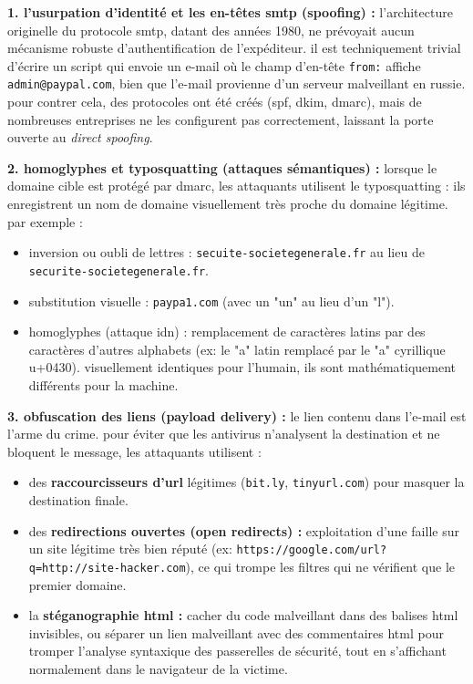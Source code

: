 \documentclass[12pt,a4paper]{report}
\begin{document}
\textbf{1. l'usurpation d'identité et les en-têtes smtp (spoofing) :}
l'architecture originelle du protocole smtp, datant des années 1980, ne prévoyait aucun mécanisme robuste d'authentification de l'expéditeur. il est techniquement trivial d'écrire un script qui envoie un e-mail où le champ d'en-tête \texttt{from:} affiche \texttt{admin@paypal.com}, bien que l'e-mail provienne d'un serveur malveillant en russie. pour contrer cela, des protocoles ont été créés (spf, dkim, dmarc), mais de nombreuses entreprises ne les configurent pas correctement, laissant la porte ouverte au \textit{direct spoofing}.

\textbf{2. homoglyphes et typosquatting (attaques sémantiques) :}
lorsque le domaine cible est protégé par dmarc, les attaquants utilisent le typosquatting : ils enregistrent un nom de domaine visuellement très proche du domaine légitime. par exemple :
\begin{itemize}
    \item inversion ou oubli de lettres : \texttt{secuite-societegenerale.fr} au lieu de \texttt{securite-societegenerale.fr}.
    \item substitution visuelle : \texttt{paypa1.com} (avec un "un" au lieu d'un "l").
    \item homoglyphes (attaque idn) : remplacement de caractères latins par des caractères d'autres alphabets (ex: le "a" latin remplacé par le "a" cyrillique u+0430). visuellement identiques pour l'humain, ils sont mathématiquement différents pour la machine.
\end{itemize}

\textbf{3. obfuscation des liens (payload delivery) :}
le lien contenu dans l'e-mail est l'arme du crime. pour éviter que les antivirus n'analysent la destination et ne bloquent le message, les attaquants utilisent :
\begin{itemize}
    \item des \textbf{raccourcisseurs d'url} légitimes (\texttt{bit.ly}, \texttt{tinyurl.com}) pour masquer la destination finale.
    \item des \textbf{redirections ouvertes (open redirects) :} exploitation d'une faille sur un site légitime très bien réputé (ex: \texttt{https://google.com/url?q=http://site-hacker.com}), ce qui trompe les filtres qui ne vérifient que le premier domaine.
    \item la \textbf{stéganographie html :} cacher du code malveillant dans des balises html invisibles, ou séparer un lien malveillant avec des commentaires html pour tromper l'analyse syntaxique des passerelles de sécurité, tout en s'affichant normalement dans le navigateur de la victime.
\end{itemize}
\end{document}
